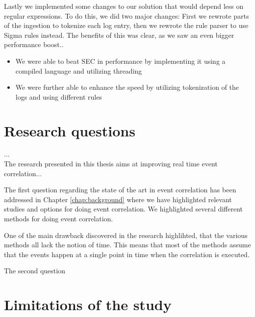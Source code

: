 Lastly we implemented some changes to our solution that would depend less on regular expressions. To do this, we did two major changes: First we rewrote parts of the ingestion to tokenize each log entry, then we rewrote the rule parser to use Sigma rules instead. The benefits of this was clear, as we saw an even bigger performance boost..


\iffalse
high signal low noise
1000 = 40.17%
10 000 = 34.19%
100 000 = 22.78%
1 000 000 = 20.5%

baseline
1000 = 89.5%
10 000 = 135.7%
100 000 = 127%
1 000 000 = 101.1%
\fi

\begin{itemize}
    \item We were able to beat SEC in performance by implementing it using a compiled language and utilizing threading
    \item We were further able to enhance the speed by utilizing tokenization of the logs and using different rules
\end{itemize}


\section{Research questions}
...\\
The research presented in this thesis aims at improving real time event correlation...


The first question regarding the state of the art in event correlation has been addressed in Chapter \cref{chap:background} where we have highlighted relevant studies and options for doing event correlation. We highlighted several different methods for doing event correlation.

One of the main drawback discovered in the research highlihted, that the various methods all lack the notion of time. This means that most of the methods assume that the events happen at a single point in time when the correlation is executed.

The second question 







\section{Limitations of the study}
\label{sec:limitations}

